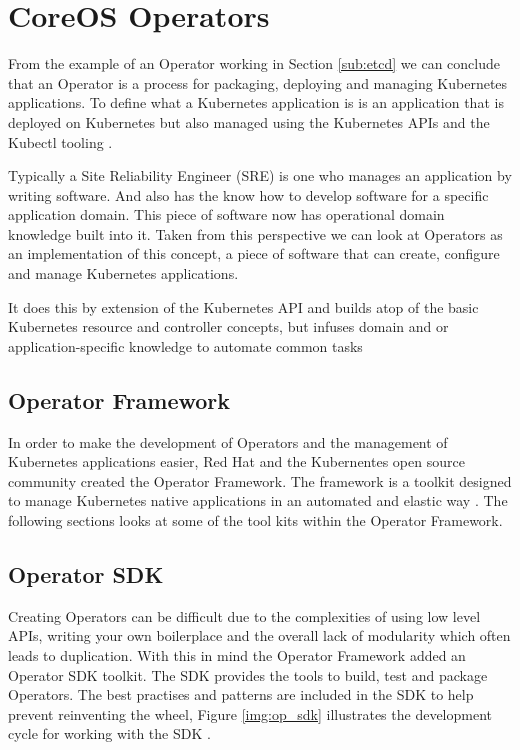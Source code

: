 \section{CoreOS Operators}
\label{sub:theory}
From the example of an Operator working in Section \ref{sub:etcd} we can conclude that an Operator is a process for packaging, deploying and managing Kubernetes applications. To define what a Kubernetes application is is an application that is deployed on Kubernetes but also managed using the Kubernetes APIs and the Kubectl tooling \citep{coreosblog}.

Typically a Site Reliability Engineer (SRE) is one who manages an application by writing software. And also has the know how to develop software for a specific application domain. This piece of software now has operational domain knowledge built into it. Taken from this perspective we can look at Operators as an implementation of this concept, a piece of software that can create, configure and manage Kubernetes applications.

It does this by extension of the Kubernetes API and builds atop of the basic Kubernetes resource and controller concepts, but infuses domain and or application-specific knowledge to automate common tasks \citep{coreosintro}

\subsection{Operator Framework}
In order to make the development of Operators and the management of Kubernetes applications easier, Red Hat and the Kubernentes open source community created the Operator Framework. The framework is a toolkit designed to manage Kubernetes native applications in an automated and elastic way \citep{framework}. The following sections looks at some of the tool kits within the Operator Framework.

\subsection{Operator SDK}
Creating Operators can be difficult due to the complexities of using low level APIs, writing your own boilerplace and the overall lack of modularity which often leads to duplication. With this in mind the Operator Framework added an Operator SDK toolkit. The SDK provides the tools to build, test and package Operators. The best practises and patterns are included in the SDK to help prevent reinventing the wheel, Figure \ref{img:op_sdk} illustrates the development cycle for working with the SDK \citep{sdk}.

